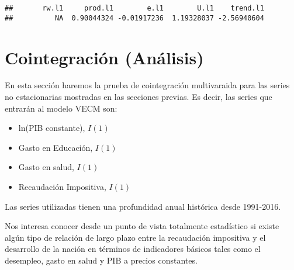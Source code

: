 \documentclass[]{book}
\newenvironment{Shaded}{\begin{snugshade}}{\end{snugshade}}
\newcommand{\KeywordTok}[1]{\textcolor[rgb]{0.13,0.29,0.53}{\textbf{#1}}}
\newcommand{\DecValTok}[1]{\textcolor[rgb]{0.00,0.00,0.81}{#1}}
\newcommand{\StringTok}[1]{\textcolor[rgb]{0.31,0.60,0.02}{#1}}
\newcommand{\OtherTok}[1]{\textcolor[rgb]{0.56,0.35,0.01}{#1}}
\newcommand{\OperatorTok}[1]{\textcolor[rgb]{0.81,0.36,0.00}{\textbf{#1}}}
\newcommand{\NormalTok}[1]{#1}
\providecommand{\tightlist}{%
  \setlength{\itemsep}{0pt}\setlength{\parskip}{0pt}}
\theoremstyle{definition}
\theoremstyle{definition}
\theoremstyle{definition}
\theoremstyle{remark}
\begin{document}
\begin{Shaded}
\end{Shaded}

\begin{verbatim}
##       rw.l1     prod.l1        e.l1        U.l1    trend.l1 
##          NA  0.90044324 -0.01917236  1.19328037 -2.56940604
\end{verbatim}

\chapter{Cointegración (Análisis)}\label{cointegracion-analisis}

En esta sección haremos la prueba de cointegración multivaraida para las
series no estacionarias mostradas en las secciones previas. Es decir,
las series que entrarán al modelo VECM son:

\begin{itemize}
\tightlist
\item
  ln(PIB constante), \(I(1)\)
\item
  Gasto en Educación, \(I(1)\)
\item
  Gasto en salud, \(I(1)\)
\item
  Recaudación Impositiva, \(I(1)\)
\end{itemize}

Las series utilizadas tienen una profundidad anual histórica desde
1991-2016.

Nos interesa conocer desde un punto de vista totalmente estadístico si
existe algún tipo de relación de largo plazo entre la recaudación
impositiva y el desarrollo de la nación en términos de indicadores
básicos tales como el desempleo, gasto en salud y PIB a precios
constantes.
\end{document}
